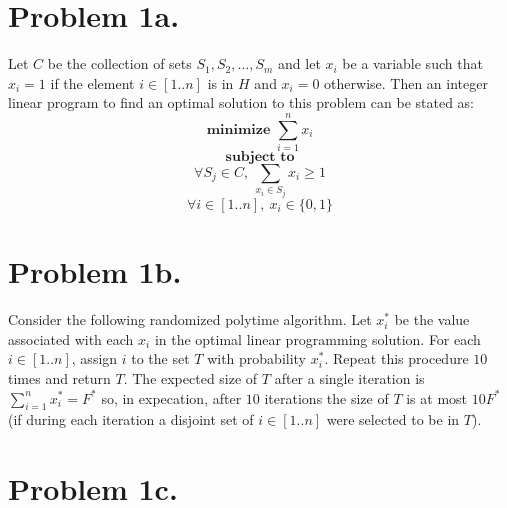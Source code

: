 \documentclass[12pt]{article}
\begin{document}
\pagestyle{plain}
\titleformat{\subsection}[runin]
  {\normalfont\large\bfseries}{\thesubsection}{1em}{}
\titleformat{\subsubsection}[runin]
  {\normalfont\large\bfseries}{\thesubsubsection}{1em}{}

\section*{Problem 1a.}
Let $C$ be the collection of sets $S_1, S_2, ...,S_m$ and let $x_i$ be a
variable such that $x_i = 1$ if the element $i \in [1..n]$ is in $H$ and
$x_i = 0$ otherwise. Then an integer linear program to find an optimal solution
to this problem can be stated as:
$$ \textbf{minimize } \sum_{i=1}^n x_i $$
$$ \textbf{ subject to } $$
$$ \forall S_j \in C,\ \sum_{x_i \in S_j} x_i \ge 1 $$
$$ \forall i \in [1..n],\ x_i \in \{0,1\} $$

\section*{Problem 1b.}
Consider the following randomized polytime algorithm. Let $x^*_i$ be the value
associated with each $x_i$ in the optimal linear programming solution. For each
$i \in [1..n]$, assign $i$ to the set $T$ with probability $x^*_i$. Repeat this
procedure $10$ times and return $T$. The expected size of $T$ after a single
iteration is $\sum^n_{i=1} x^*_i = F^*$ so, in expecation, after $10$ iterations
the size of $T$ is at most $10 F^*$ (if during each iteration a disjoint set of
$i \in [1..n]$ were selected to be in $T$).

\section*{Problem 1c.}
\end{document}
